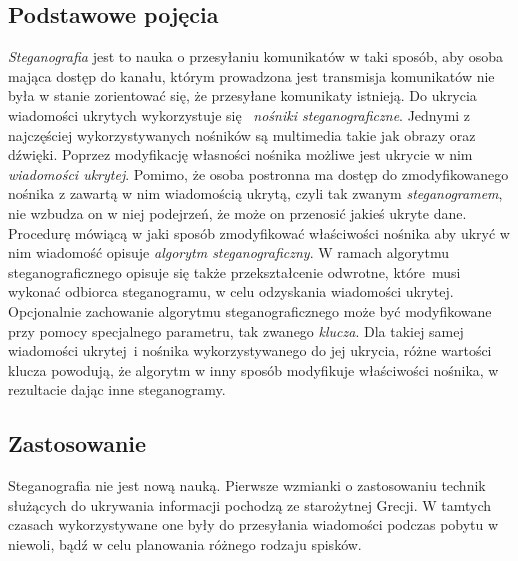 \documentclass[a4paper, twoside, 12pt]{report}
\begin{document}
        \subsection{Podstawowe pojęcia} \label{STEGANOGRAFIAPOJECIA}
        \emph{Steganografia} jest to nauka o przesyłaniu komunikatów w taki sposób, aby
        osoba mająca dostęp do kanału, którym prowadzona jest transmisja komunikatów
        nie była w stanie zorientować się, że przesyłane komunikaty istnieją.
        Do ukrycia wiadomości ukrytych wykorzystuje się 
        \emph{nośniki steganograficzne}\cite{STEGANOGRAFIASIECIOWAART}.
        Jednymi z najczęściej wykorzystywanych nośników są multimedia takie jak
        obrazy oraz dźwięki. Poprzez modyfikację własności nośnika możliwe jest
        ukrycie w nim \emph{wiadomości ukrytej}. Pomimo, że osoba postronna ma
        dostęp do zmodyfikowanego nośnika z zawartą w nim wiadomością ukrytą,
        czyli tak zwanym \emph{steganogramem}, nie wzbudza on w niej podejrzeń,
        że może on przenosić jakieś ukryte dane. Procedurę mówiącą w jaki sposób
        zmodyfikować właściwości nośnika aby ukryć w nim wiadomość opisuje
        \emph{algorytm steganograficzny}. W ramach algorytmu steganograficznego
        opisuje się także przekształcenie odwrotne, które musi
        wykonać odbiorca steganogramu, w celu odzyskania wiadomości ukrytej.
        Opcjonalnie zachowanie algorytmu steganograficznego może być modyfikowane przy pomocy specjalnego
        parametru, tak zwanego \emph{klucza}.  Dla takiej samej wiadomości ukrytej~i nośnika
        wykorzystywanego do jej ukrycia, różne wartości klucza powodują, że algorytm
        w inny sposób modyfikuje właściwości nośnika, w rezultacie dając inne
        steganogramy.

        \subsection{Zastosowanie}
        Steganografia nie jest nową nauką. Pierwsze wzmianki o zastosowaniu technik
        służących do ukrywania informacji pochodzą ze starożytnej Grecji.\cite{STEGANOGRAPHYINTRO}
        W tamtych czasach wykorzystywane one były do przesyłania wiadomości
        podczas pobytu w niewoli, bądź w celu planowania różnego rodzaju spisków.
\end{document}
